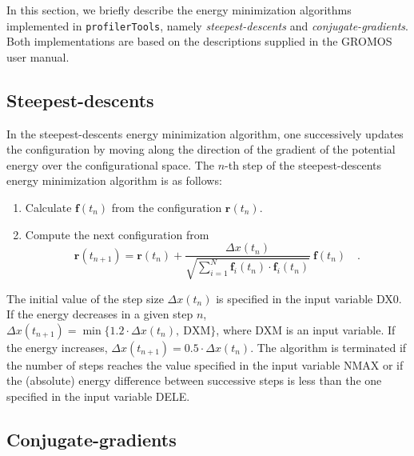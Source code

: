 \documentclass[10pt,a4paper,openany]{memoir}
\numberwithin{equation}{section}
\newcommand{\fsub}[1]{\mathbf{f}_{#1}}
\newcommand{\profilertools}[0]{\texttt{profilerTools}}
\begin{document}
In this section, we briefly describe the energy minimization algorithms implemented in \profilertools{}, namely
\textit{steepest-descents} and
\textit{conjugate-gradients}.
Both implementations are based on the descriptions supplied in the GROMOS user manual\cite{GROMOS-doc}.

\subsection{Steepest-descents}
\label{sec:steep}

In the steepest-descents energy minimization algorithm, one successively updates the configuration by moving along the direction of the gradient of the potential energy over the configurational space.
The $n$-th step of the steepest-descents energy minimization algorithm is as follows: 
\begin{enumerate}
\item Calculate $\mathbf{f}(t_n)$ from the configuration $\mathbf{r}(t_n)$.
\item Compute the next configuration from
  \begin{equation}
    \label{eq:em-steep}
  \mathbf{r}(t_{n+1}) = \mathbf{r}(t_n) + \frac{\Delta x(t_n)}{\sqrt{\sum_{i=1}^N \fsub{i}(t_n)\cdot\fsub{i}(t_n)}}\ \mathbf{f}(t_n) \quad .
  \end{equation}
\end{enumerate}

The initial value of the step size $\Delta x(t_n)$ is specified in the input variable DX0.
If the energy decreases in a given step $n$, $\Delta x(t_{n+1}) = \min{\{1.2\cdot\Delta x(t_{n}),\ \text{DXM}\}}$, where DXM is an input variable.
If the energy increases, $\Delta x(t_{n+1}) = 0.5\cdot\Delta x(t_{n})$.
The algorithm is terminated if the number of steps reaches the value specified in the input variable NMAX or if the (absolute) energy difference between successive steps is less than the one specified in the input variable DELE.

\subsection{Conjugate-gradients}
\label{sec:conjugate-gradients}
\end{document}
